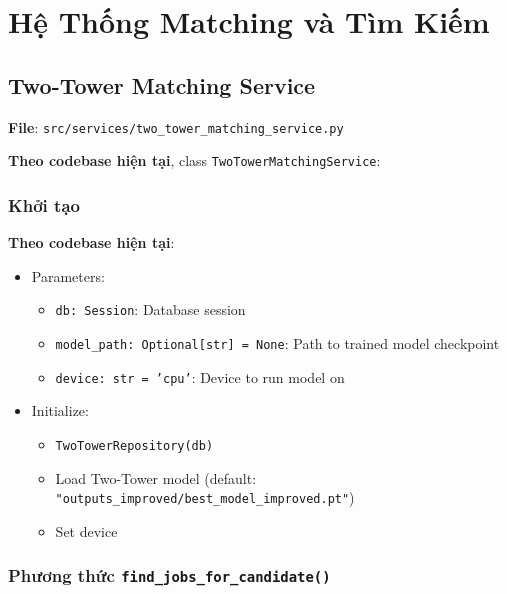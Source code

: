 \section{Hệ Thống Matching và Tìm Kiếm}


\subsection{Two-Tower Matching Service}

\textbf{File}: \texttt{src/services/two\_tower\_matching\_service.py}

\textbf{Theo codebase hiện tại}, class \texttt{TwoTowerMatchingService}:

\subsubsection{Khởi tạo}

\textbf{Theo codebase hiện tại}:

\begin{itemize}
    \item Parameters:
    \begin{itemize}
        \item \texttt{db: Session}: Database session
        \item \texttt{model\_path: Optional[str] = None}: Path to trained model checkpoint
        \item \texttt{device: str = 'cpu'}: Device to run model on
    \end{itemize}
    \item Initialize:
    \begin{itemize}
        \item \texttt{TwoTowerRepository(db)}
        \item Load Two-Tower model (default: \texttt{"outputs\_improved/best\_model\_improved.pt"})
        \item Set device
    \end{itemize}
\end{itemize}

\subsubsection{Phương thức \texttt{find\_jobs\_for\_candidate()}}

